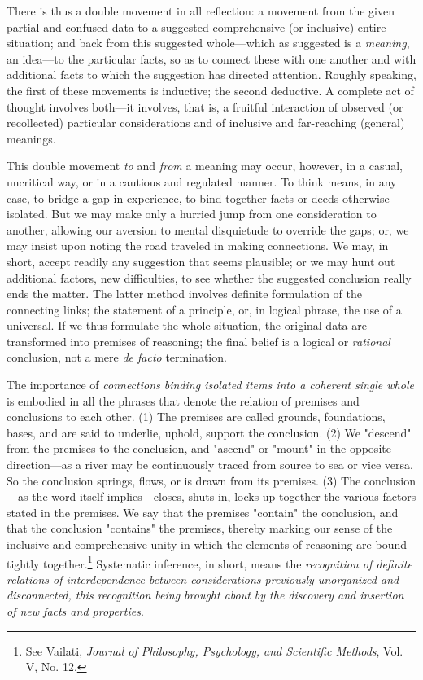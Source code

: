 \documentclass[showtrims,ustradepaper]{memoir}
\begin{document}

There is thus a double movement in all reflection: a movement from the
given partial and confused data to a suggested comprehensive (or
inclusive) entire situation; and back from this suggested whole---which
as suggested is a \emph{meaning}, an idea---to the particular facts, so
as to connect these with one another and with additional facts to which
the suggestion has directed attention. Roughly speaking, the first of
these
movements
is inductive; the second deductive. A complete act of thought involves
both---it involves, that is, a fruitful interaction of observed (or
recollected) particular considerations and of inclusive and far-reaching
(general) meanings.


This double movement \emph{to} and \emph{from} a meaning may occur,
however, in a casual, uncritical way, or in a cautious and regulated
manner. To think means, in any case, to bridge a gap in experience, to
bind together facts or deeds otherwise isolated. But we may make only a
hurried jump from one consideration to another, allowing our aversion to
mental disquietude to override the gaps; or, we may insist upon noting
the road traveled in making connections. We may, in short, accept
readily any suggestion that seems plausible; or we may hunt out
additional factors, new difficulties, to see whether the suggested
conclusion really ends the matter. The latter method involves definite
formulation of the connecting links; the statement of a principle, or,
in logical phrase, the use of a universal. If we thus formulate the
whole situation, the original data are transformed into premises of
reasoning; the final belief is a logical or \emph{rational} conclusion,
not a mere \emph{de facto} termination.


The importance of \emph{connections binding isolated items into a
coherent single whole} is embodied in all the phrases that denote the
relation of premises and conclusions to each other. (1) The premises are
called grounds, foundations, bases, and are said to underlie, uphold,
support the conclusion. (2) We "descend" from the premises to the
conclusion, and "ascend" or "mount" in the opposite direction---as a
river may be continuously traced from source to sea or vice versa. So
the conclusion springs, flows, or is drawn from its
premises.
(3) The conclusion---as the word itself implies---closes, shuts in,
locks up together the various factors stated in the premises. We say
that the premises "contain" the conclusion, and that the conclusion
"contains" the premises, thereby marking our sense of the inclusive and
comprehensive unity in which the elements of reasoning are bound tightly
together.\footnote{
See Vailati, \emph{Journal of Philosophy, Psychology, and Scientific
Methods}, Vol. V, No. 12.}
Systematic inference, in short, means the \emph{recognition of definite
relations of interdependence between considerations previously
unorganized and disconnected, this recognition being brought about by
the discovery and insertion of new facts and properties}.
\end{document}
